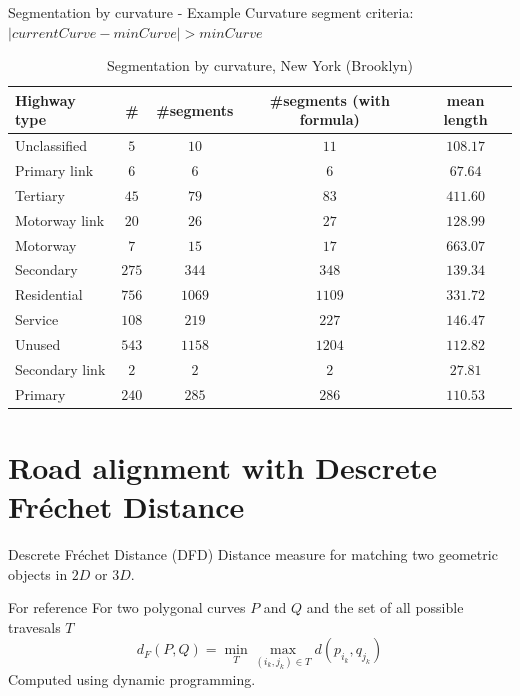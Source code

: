 \documentclass{beamer}
\begin{document}
\begin{frame}{Segmentation by curvature - Example}
  Curvature segment criteria: $|currentCurve - minCurve| > minCurve$
  \begin{scriptsize}
    \begin{table}
      \caption{Segmentation by curvature, New York (Brooklyn)}
      \label{table:1}
      \begin{tabular}{ l | c c c c }
        \hline
        Highway type & \# & \#segments & \#segments (with formula) & mean length\\
        \hline
        Unclassified & $5$ & $10$ & $11$ & $108.17$\\
        Primary link & $6$ & $6$ & $6$ & $67.64$\\
        Tertiary & $45$ & $79$ & $83$ & $411.60$\\
        Motorway link & $20$ & $26$ & $27$ & $128.99$\\
        Motorway & $7$ & $15$ & $17$ & $663.07$\\
        Secondary & $275$ & $344$ & $348$ & $139.34$\\
        Residential & $756$ & $1069$ & $1109$ & $331.72$\\
        Service & $108$ & $219$ & $227$ & $146.47$\\
        Unused & $543$ & $1158$ & $1204$ & $112.82$\\
        Secondary link & $2$ & $2$ & $2$ & $27.81$\\
        Primary & $240$ & $285$ & $286$ & $110.53$
      \end{tabular}
    \end{table}
  \end{scriptsize}
\end{frame}

\section{Road alignment with Descrete Fréchet Distance}

\begin{frame}{Descrete Fréchet Distance (DFD)}
  Distance measure for matching two geometric objects in $2D$ or $3D$.
  \begin{block}{For reference}
    For two polygonal curves $P$ and $Q$ and the set of all possible travesals $T$
    \[
      d_F(P,Q) = \min_T \max_{(i_k,j_k) \in T} d(p_{i_k}, q_{j_k})
    \]
    Computed using dynamic programming.
  \end{block}
\end{frame}
\end{document}
